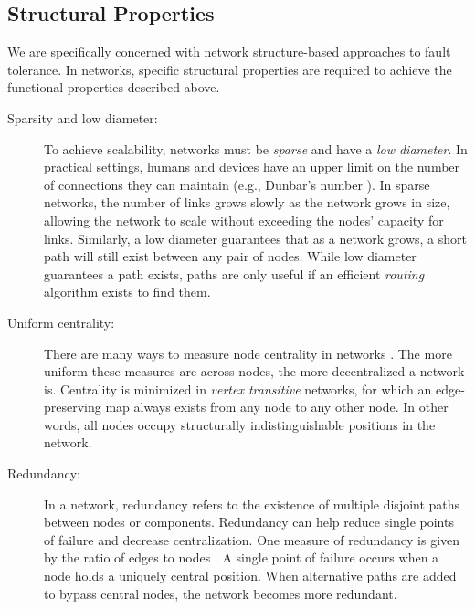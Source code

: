 \subsection{Structural Properties}

We are specifically concerned with network structure-based approaches to
fault tolerance.
In networks, specific structural properties are required to achieve the
functional properties described above.
\begin{description}
\item [Sparsity and low diameter:]
To achieve scalability, networks must be {\em sparse} and have a
{\em low diameter}.
In practical settings, humans and devices have an upper limit on the number
of connections they can maintain (e.g., Dunbar's number
\cite{dunbar_neocortex_1992}).
In sparse networks, the number of links grows slowly as the network grows in
size, allowing the network to scale without exceeding the nodes' capacity for
links.
Similarly, a low diameter guarantees that as a network grows, a short path will
still exist between any pair of nodes.
While low diameter guarantees a path exists,
paths are only useful if an efficient {\em routing} algorithm exists
to find them.

\item [Uniform centrality:]
There are many ways to measure node centrality in networks
\cite{freeman_centrality_1978}.
The more uniform these measures are across nodes, the more decentralized
a network is.
Centrality is minimized in {\em vertex transitive} networks,
for which an edge-preserving map
always exists from any node to any other node.
In other words, all nodes occupy structurally indistinguishable positions
in the network.

\item [Redundancy:]
In a network, redundancy refers to the existence of multiple disjoint
paths between nodes or components.
Redundancy can help reduce single points of failure and decrease
centralization.
One measure of redundancy is given by the ratio of edges to nodes
\cite{baran_distributed_1964}.
A single point of failure occurs when a node holds a uniquely
central position.
When alternative paths are added to bypass central nodes,
the network becomes more redundant.

\end{description}
